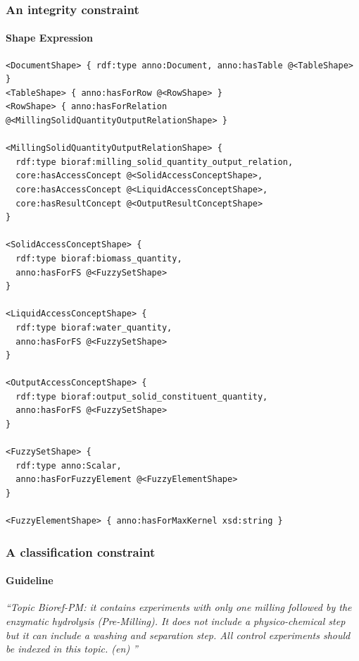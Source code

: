 \documentclass{beamer}
\begin{document}
\begin{frame}[fragile]
  \frametitle{An integrity constraint}
  \framesubtitle{Shape Expression}

  \begin{Verbatim}[fontsize=\tiny]
<DocumentShape> { rdf:type anno:Document, anno:hasTable @<TableShape> }
<TableShape> { anno:hasForRow @<RowShape> }
<RowShape> { anno:hasForRelation @<MillingSolidQuantityOutputRelationShape> }

<MillingSolidQuantityOutputRelationShape> {
  rdf:type bioraf:milling_solid_quantity_output_relation,
  core:hasAccessConcept @<SolidAccessConceptShape>,
  core:hasAccessConcept @<LiquidAccessConceptShape>,
  core:hasResultConcept @<OutputResultConceptShape>
}

<SolidAccessConceptShape> {
  rdf:type bioraf:biomass_quantity,
  anno:hasForFS @<FuzzySetShape>
}

<LiquidAccessConceptShape> {
  rdf:type bioraf:water_quantity,
  anno:hasForFS @<FuzzySetShape>
}

<OutputAccessConceptShape> {
  rdf:type bioraf:output_solid_constituent_quantity,
  anno:hasForFS @<FuzzySetShape>
}

<FuzzySetShape> {
  rdf:type anno:Scalar,
  anno:hasForFuzzyElement @<FuzzyElementShape>
}

<FuzzyElementShape> { anno:hasForMaxKernel xsd:string }
  \end{Verbatim}

\end{frame}

\begin{frame}
  \frametitle{A classification constraint}
  \framesubtitle{Guideline}

  \textit{``Topic Bioref-PM: it contains experiments with only one milling
    followed by the enzymatic hydrolysis (Pre-Milling). It does not include a
    physico-chemical step but it can include a washing and separation step. All
    control experiments should be indexed in this topic. (en) ''}
\end{frame}
\end{document}
